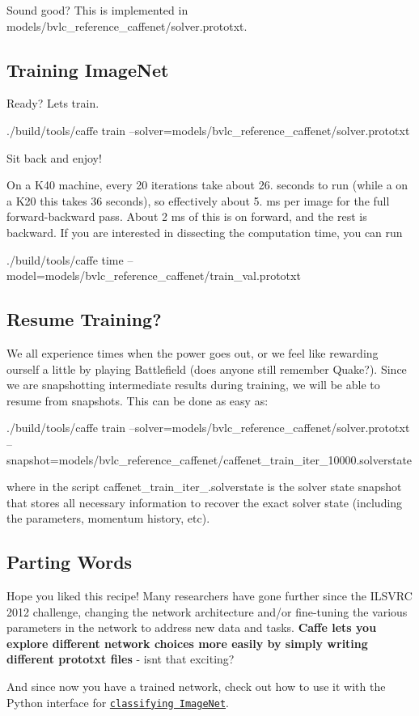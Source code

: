 Sound good? This is implemented in {\ttfamily models/bvlc\+\_\+reference\+\_\+caffenet/solver.\+prototxt}.

\subsection*{Training Image\+Net }

Ready? Let\textquotesingle{}s train. \begin{DoxyVerb}./build/tools/caffe train --solver=models/bvlc_reference_caffenet/solver.prototxt
\end{DoxyVerb}


Sit back and enjoy!

On a K40 machine, every 20 iterations take about 26. seconds to run (while a on a K20 this takes 36 seconds), so effectively about 5. ms per image for the full forward-\/backward pass. About 2 ms of this is on forward, and the rest is backward. If you are interested in dissecting the computation time, you can run \begin{DoxyVerb}./build/tools/caffe time --model=models/bvlc_reference_caffenet/train_val.prototxt
\end{DoxyVerb}


\subsection*{Resume Training? }

We all experience times when the power goes out, or we feel like rewarding ourself a little by playing Battlefield (does anyone still remember Quake?). Since we are snapshotting intermediate results during training, we will be able to resume from snapshots. This can be done as easy as\+: \begin{DoxyVerb}./build/tools/caffe train --solver=models/bvlc_reference_caffenet/solver.prototxt --snapshot=models/bvlc_reference_caffenet/caffenet_train_iter_10000.solverstate
\end{DoxyVerb}


where in the script {\ttfamily caffenet\+\_\+train\+\_\+iter\+\_.\+solverstate} is the solver state snapshot that stores all necessary information to recover the exact solver state (including the parameters, momentum history, etc).

\subsection*{Parting Words }

Hope you liked this recipe! Many researchers have gone further since the I\+L\+S\+V\+RC 2012 challenge, changing the network architecture and/or fine-\/tuning the various parameters in the network to address new data and tasks. {\bfseries Caffe lets you explore different network choices more easily by simply writing different prototxt files} -\/ isn\textquotesingle{}t that exciting?

And since now you have a trained network, check out how to use it with the Python interface for \href{http://nbviewer.ipython.org/github/BVLC/caffe/blob/master/examples/00-classification.ipynb}{\tt classifying Image\+Net}. 